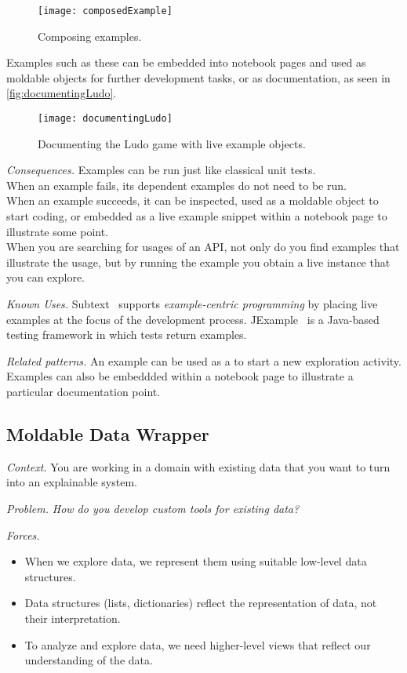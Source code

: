 \documentclass[acmsmall,screen,authorversion,nonacm]{acmart} %
\newcommand\ws[1]{\nbe{Workshop}{#1}{teal}} %
\newcommand{\pattern}[2]{\needlines{10}
\subsection*{#1}\label{pat:#2}}
\newcommand{\patref}[1]{\emph{\nameref{pat:#1}}\xspace}
\newcommand{\patsec}[1]{\noindent\textit{#1.}\xspace}
\begin{document}
\begin{figure}[h]
  \texttt{[image: composedExample]}
  \caption{Composing examples.}
  \label{fig:composedExample}
\end{figure}

Examples such as these can be embedded into notebook pages and used as moldable objects for further development tasks, or as documentation, as seen in \autoref{fig:documentingLudo}.

\begin{figure}[h]
  \texttt{[image: documentingLudo]}
  \caption{Documenting the Ludo game with live example objects.}
  \label{fig:documentingLudo}
\end{figure}

    
\patsec{Consequences}
Examples can be run just like classical unit tests.\\
When an example fails, its dependent examples do not need to be run.\\
When an example succeeds, it can be inspected, used as a moldable object to start coding, or embedded as a live example snippet within a notebook page to illustrate some point.\\
When you are searching for usages of an API, not only do you find examples that illustrate the usage, but by running the example you obtain a live instance that you can explore.

\patsec{Known Uses}
Subtext~\cite{Edwa04a} supports \emph{example-centric programming} by placing live examples at the focus of the development process.
JExample~\cite{Kuhn08a} is a Java-based testing framework in which tests return examples.

\patsec{Related patterns}
An example can be used as a \patref{MoldableObject} to start a new exploration activity.
Examples can also be embeddded within a \patref{ProjectDiary} notebook page to illustrate a particular documentation point.

\pattern{Moldable Data Wrapper}{MoldableDataWrapper}


\patsec{Context}
You are working in a domain with existing data that you want to turn into an explainable system.

\patsec{Problem}
\emph{How do you develop custom tools for existing data?}

\patsec{Forces}
\begin{itemize}[---]
\item When we explore data, we represent them using suitable low-level data structures.
\item Data structures (lists, dictionaries) reflect the representation of data, not their interpretation.
\item To analyze and explore data, we need higher-level views that reflect our understanding of the data.
\end{itemize}
\end{document}
